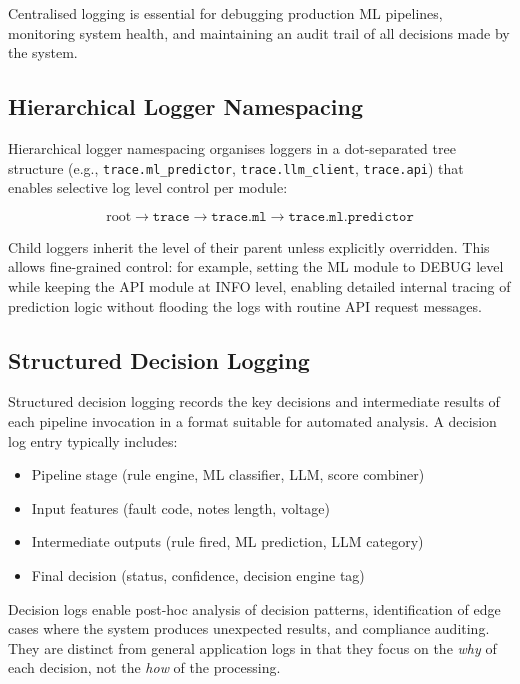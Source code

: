 \documentclass[10pt,a4paper]{article}
\begin{document}
Centralised logging is essential for debugging production ML pipelines, monitoring system health, and maintaining an audit trail of all decisions made by the system.

\subsection{Hierarchical Logger Namespacing}
\label{sec:logger-namespacing}

Hierarchical logger namespacing organises loggers in a dot-separated tree structure (e.g., \texttt{trace.ml\_predictor}, \texttt{trace.llm\_client}, \texttt{trace.api}) that enables selective log level control per module:

\begin{equation}
\text{root} \to \texttt{trace} \to \texttt{trace.ml} \to \texttt{trace.ml.predictor}
\label{eq:logger-hierarchy}
\end{equation}

Child loggers inherit the level of their parent unless explicitly overridden. This allows fine-grained control: for example, setting the ML module to DEBUG level while keeping the API module at INFO level, enabling detailed internal tracing of prediction logic without flooding the logs with routine API request messages.

\subsection{Structured Decision Logging}
\label{sec:decision-logging}

Structured decision logging records the key decisions and intermediate results of each pipeline invocation in a format suitable for automated analysis. A decision log entry typically includes:

\begin{itemize}
    \item Pipeline stage (rule engine, ML classifier, LLM, score combiner)
    \item Input features (fault code, notes length, voltage)
    \item Intermediate outputs (rule fired, ML prediction, LLM category)
    \item Final decision (status, confidence, decision engine tag)
\end{itemize}

Decision logs enable post-hoc analysis of decision patterns, identification of edge cases where the system produces unexpected results, and compliance auditing. They are distinct from general application logs in that they focus on the \emph{why} of each decision, not the \emph{how} of the processing.
\end{document}
